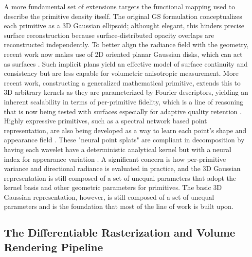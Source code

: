 \documentclass[11pt,a4paper]{article}
\begin{document}
A more fundamental set of extensions targets the functional mapping used to describe the primitive density itself. The original GS formulation conceptualizes each primitive as a 3D Gaussian ellipsoid; althought elegant, this hinders precise surface reconstruction because surface-distributed opacity overlaps are reconstructed independently. To better align the radiance field with the geometry, recent work now makes use of 2D oriented planar Gaussian disks, which can act as surfaces \cite{arxiv:2403.17888v1,arxiv:2409.12954v1}. Such implicit plans yield an effective model of surface continuity and consistency but are less capable for volumetric anisotropic measurement. More recent work, constructing a generalized mathematical primitive, extends this to 3D arbitrary kernels as they are parameterized by Fourier descriptors, yielding an inherent scalability in terms of per-primitive fidelity, which is a line of reasoning that is now being tested with surfaces especially for adaptive quality retention \cite{arxiv:2603.19834v3}. Highly expressive primitives, such as a spectral network based point representation, are also being developed as a way to learn each point's shape and appearance field \cite{arxiv:2510.08491v2,arxiv:2510.08491v2}. These "neural point splats" are compliant in decomposition by having each wavelet have a deterministic analytical kernel but with a neural index for appearance variation \cite{arxiv:2510.08491v2}. A significant concern is how per-primitive variance and directional radiance is evaluated in practice, and the 3D Gaussian representation is still composed of a set of unequal parameters that adopt the kernel basis and other geometric parameters for primitives. The basic 3D Gaussian representation, however, is still composed of a set of unequal parameters and is the foundation that most of the line of work is built upon.


\subsection{The Differentiable Rasterization and Volume Rendering Pipeline}
\end{document}
